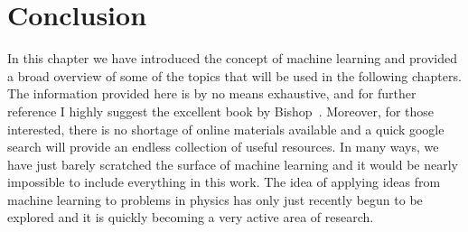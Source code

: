 \documentclass[../main.tex]{subfiles}
\begin{document}
\section{Conclusion}
In this chapter we have introduced the concept of machine learning and provided a broad overview of some of the topics
that will be used in the following chapters.
%
The information provided here is by no means exhaustive, and for further reference I highly suggest the excellent book
by Bishop~\cite{Bishop:2006:PRM:1162264}.
%
Moreover, for those interested, there is no shortage of online materials available and a quick google search
will provide an endless collection of useful resources.
%
In many ways, we have just barely scratched the surface of machine learning and it would be nearly impossible to
include everything in this work.
%
The idea of applying ideas from machine learning to problems in physics has only just recently begun to be explored and
it is quickly becoming a very active area of research.
%
\end{document}
